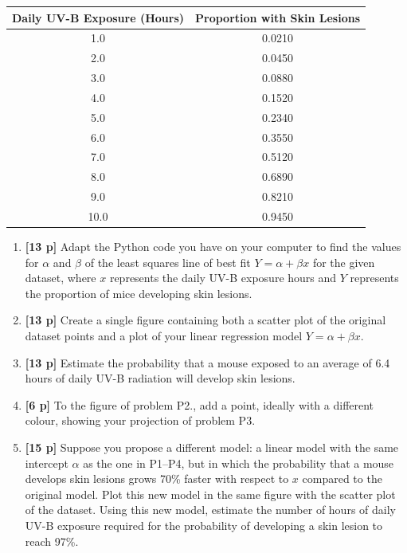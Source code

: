\documentclass[11pt,svgnames,spanish,oneside]{amsart}
\begin{document}
\begin{center}
\renewcommand{\arraystretch}{1.15}
\begin{tabular}{|c|c|}
  \hline
  \textbf{Daily UV-B Exposure (Hours)} & \textbf{Proportion with Skin Lesions} \\ \hline
  1.0 & 0.0210 \\ \hline
  2.0 & 0.0450 \\ \hline
  3.0 & 0.0880 \\ \hline
  4.0 & 0.1520 \\ \hline
  5.0 & 0.2340 \\ \hline
  6.0 & 0.3550 \\ \hline
  7.0 & 0.5120 \\ \hline
  8.0 & 0.6890 \\ \hline
  9.0 & 0.8210 \\ \hline
  10.0 & 0.9450 \\ \hline
\end{tabular}
\end{center}
\medskip
\begin{enumerate}[label=\textbf{P\arabic*.},itemsep=1em]
  \item \textbf{[13 p]} Adapt the Python code you have on your computer to find the values for $\alpha$ and $\beta$ of the least squares line of best fit $Y = \alpha + \beta x$ for the given dataset, where $x$ represents the daily UV-B exposure hours and $Y$ represents the proportion of mice developing skin lesions.

  \item \textbf{[13 p]} Create a single figure containing both a scatter plot of the original dataset points and a plot of your linear regression model $Y = \alpha + \beta x$.

  \item \textbf{[13 p]} Estimate the probability that a mouse exposed to an average of 6.4 hours of daily UV-B radiation will develop skin lesions.

  \item \textbf{[6 p]} To the figure of problem P2., add a point, ideally with a different colour, showing your projection of problem P3.

  \item \textbf{[15 p]} Suppose you propose a different model: a linear model with the same intercept $\alpha$ as the one in P1--P4, but in which the probability that a mouse develops skin lesions grows 70\% faster with respect to $x$ compared to the original model. Plot this new model in the same figure with the scatter plot of the dataset. Using this new model, estimate the number of hours of daily UV-B exposure required for the probability of developing a skin lesion to reach 97\%.

\end{enumerate}
\end{document}
